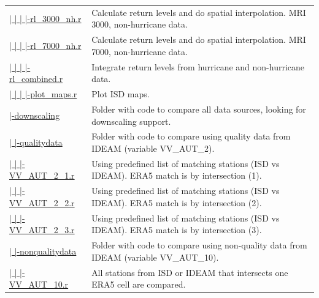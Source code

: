 \documentclass[12pt,oneside]{reedthesis}
\begin{document}
\begin{longtable}[t]{>{\raggedright\arraybackslash}p{1.3in}>{\raggedright\arraybackslash}p{4.9in}}
\href{ftp://ftp.geocorp.co/windthesis/code/pot_pp/isd/maps/return_levels_3000_nh.r}{  |    |    |    |-rl\_3000\_nh.r} & Calculate return levels and do spatial interpolation. MRI 3000, non-hurricane data.\\
\href{ftp://ftp.geocorp.co/windthesis/code/pot_pp/isd/maps/return_levels_7000_nh.r}{  |    |    |    |-rl\_7000\_nh.r} & Calculate return levels and do spatial interpolation. MRI 7000, non-hurricane data.\\
\href{ftp://ftp.geocorp.co/windthesis/code/pot_pp/isd/maps/return_levels_combined.r}{  |    |    |    |-rl\_combined.r} & Integrate return levels from hurricane and non-hurricane data.\\
\href{ftp://ftp.geocorp.co/windthesis/code/pot_pp/isd/maps/plot_maps.r}{  |    |    |    |-plot\_maps.r} & Plot ISD maps.\\
\href{ftp://ftp.geocorp.co/windthesis/code/downscaling/}{  |-downscaling} & Folder with code to compare all data sources, looking for downscaling support.\\
\href{ftp://ftp.geocorp.co/windthesis/code/downscaling/qualitydata/}{  |    |-qualitydata} & Folder with code to compare using quality data from IDEAM (variable VV\_AUT\_2).\\
\href{ftp://ftp.geocorp.co/windthesis/code/downscaling/qualitydata/comparing_VV_AUT_2_1.r}{  |    |    |-VV\_AUT\_2\_1.r} & Using predefined list of matching stations (ISD vs IDEAM). ERA5 match is by intersection (1).\\
\href{ftp://ftp.geocorp.co/windthesis/code/downscaling/qualitydata/comparing_VV_AUT_2_2.r}{  |    |    |-VV\_AUT\_2\_2.r} & Using predefined list of matching stations (ISD vs IDEAM). ERA5 match is by intersection (2).\\
\href{ftp://ftp.geocorp.co/windthesis/code/downscaling/qualitydata/comparing_VV_AUT_2_3.r}{  |    |    |-VV\_AUT\_2\_3.r} & Using predefined list of matching stations (ISD vs IDEAM). ERA5 match is by intersection (3).\\
\href{ftp://ftp.geocorp.co/windthesis/code/downscaling/nonqualitydata/}{  |    |-nonqualitydata} & Folder with code to compare using non-quality data from IDEAM (variable VV\_AUT\_10).\\
\href{ftp://ftp.geocorp.co/windthesis/code/downscaling/nonqualitydata/comparing_VV_AUT_10.r}{  |    |    |-VV\_AUT\_10.r} & All stations from ISD or IDEAM that intersects one ERA5 cell are compared.\\
\bottomrule
\end{longtable}
\endgroup{}
\end{document}
